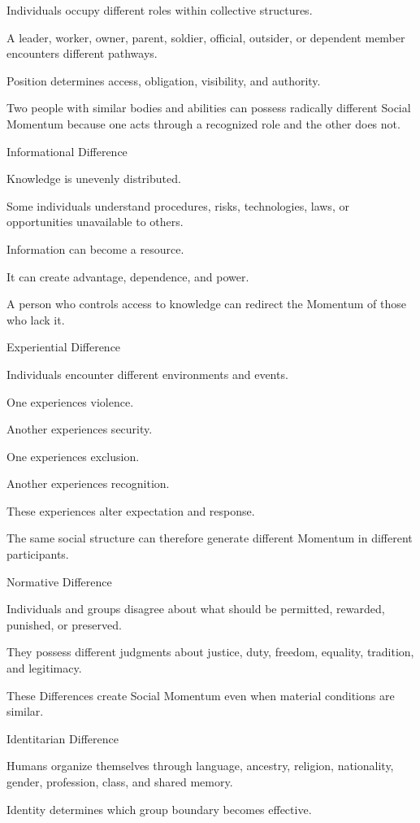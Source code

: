 Individuals occupy different roles within collective structures.

A leader, worker, owner, parent, soldier, official, outsider, or dependent member encounters different pathways.

Position determines access, obligation, visibility, and authority.

Two people with similar bodies and abilities can possess radically different Social Momentum because one acts through a recognized role and the other does not.

Informational Difference

Knowledge is unevenly distributed.

Some individuals understand procedures, risks, technologies, laws, or opportunities unavailable to others.

Information can become a resource.

It can create advantage, dependence, and power.

A person who controls access to knowledge can redirect the Momentum of those who lack it.

Experiential Difference

Individuals encounter different environments and events.

One experiences violence.

Another experiences security.

One experiences exclusion.

Another experiences recognition.

These experiences alter expectation and response.

The same social structure can therefore generate different Momentum in different participants.

Normative Difference

Individuals and groups disagree about what should be permitted, rewarded, punished, or preserved.

They possess different judgments about justice, duty, freedom, equality, tradition, and legitimacy.

These Differences create Social Momentum even when material conditions are similar.

Identitarian Difference

Humans organize themselves through language, ancestry, religion, nationality, gender, profession, class, and shared memory.

Identity determines which group boundary becomes effective.

